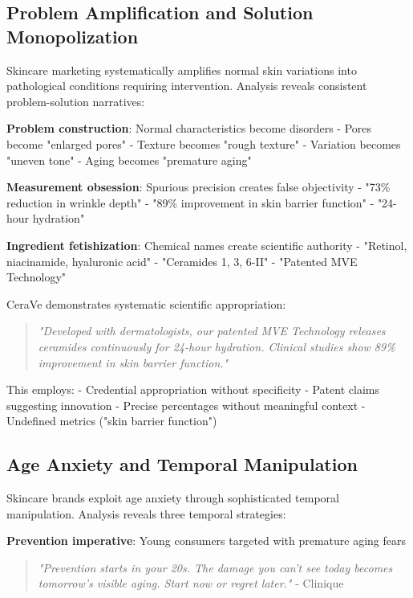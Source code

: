 \subsection{Problem Amplification and Solution Monopolization}

Skincare marketing systematically amplifies normal skin variations into pathological conditions requiring intervention. Analysis reveals consistent problem-solution narratives:

\textbf{Problem construction}: Normal characteristics become disorders
- Pores become "enlarged pores"
- Texture becomes "rough texture"
- Variation becomes "uneven tone"
- Aging becomes "premature aging"

\textbf{Measurement obsession}: Spurious precision creates false objectivity
- "73\% reduction in wrinkle depth"
- "89\% improvement in skin barrier function"
- "24-hour hydration"

\textbf{Ingredient fetishization}: Chemical names create scientific authority
- "Retinol, niacinamide, hyaluronic acid"
- "Ceramides 1, 3, 6-II"
- "Patented MVE Technology"

CeraVe demonstrates systematic scientific appropriation:

\begin{quote}
\textit{"Developed with dermatologists, our patented MVE Technology releases ceramides continuously for 24-hour hydration. Clinical studies show 89\% improvement in skin barrier function."}
\end{quote}

This employs:
- Credential appropriation without specificity
- Patent claims suggesting innovation
- Precise percentages without meaningful context
- Undefined metrics ("skin barrier function")

\subsection{Age Anxiety and Temporal Manipulation}

Skincare brands exploit age anxiety through sophisticated temporal manipulation. Analysis reveals three temporal strategies:

\textbf{Prevention imperative}: Young consumers targeted with premature aging fears
\begin{quote}
\textit{"Prevention starts in your 20s. The damage you can't see today becomes tomorrow's visible aging. Start now or regret later."} - Clinique
\end{quote}

